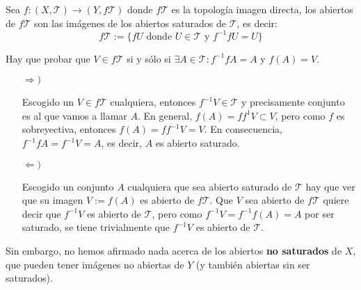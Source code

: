 \begin{prop}
Sea $f : (X, \mathcal{T}) \rightarrow (Y, f\mathcal{T})$ donde $f\mathcal{T}$ es la topología imagen directa, los abiertos de $f\mathcal{T}$ son las imágenes de los abiertos saturados de $\mathcal{T}$, es decir:
\[
f\mathcal{T} := \{fU \mbox{ donde } U \in \mathcal{T} \text{ y } f^{-1}fU = U\}
\]
\end{prop}
\begin{demo}
Hay que probar que $V\in f \mathcal{T}$ si y sólo si $\exists A \in \mathcal{T} : f^{-1}fA=A$ y $f(A) = V$.
\begin{itemize}
   	\item[$\Rightarrow)$]
   	
   	Escogido un $V \in f\mathcal{T}$ cualquiera, entonces $f^{-1}V \in \mathcal{T}$ y precisamente conjunto es al que vamos a llamar $A$. En general, $f(A) = ff^{1}V \subset V$, pero como $f$ es sobreyectiva, entonces $f(A)=ff^{-1}V=V$. En consecuencia, $f^{-1}fA=f^{-1}V = A$, es decir, $A$ es abierto saturado.
   	   	
    \item[$\Leftarrow)$] 
    
	Escogido un conjunto $A$ cualquiera que sea abierto saturado de $\mathcal{T}$ hay que ver que su imagen $V := f(A)$ es abierto de $f\mathcal{T}$. Que $V$ sea abierto de $f\mathcal{T}$ quiere decir que $f^{-1}V$ es abierto de $\mathcal{T}$, pero como $f^{-1}V=f^{-1}f(A) = A$ por ser saturado, se tiene trivialmente que $f^{-1}V$ es abierto de $\mathcal{T}$.
\end{itemize}
\end{demo}

\begin{obs}
Sin embargo, no hemos afirmado nada acerca de los abiertos \textbf{no saturados} de $X$, que pueden tener imágenes no abiertas de $Y$ (y también abiertas sin ser saturados).
\end{obs}

